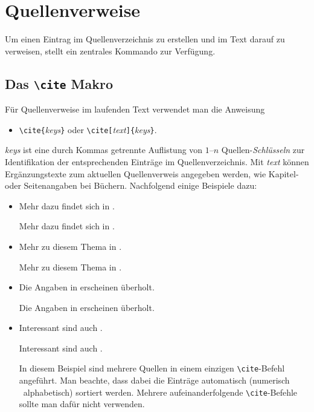 \section{Quellenverweise}

Um einen Eintrag im Quellenverzeichnis zu erstellen und im Text darauf zu verweisen, stellt \latex ein zentrales Kommando zur Verfügung.

\subsection{Das \texttt{\textbackslash cite} Makro}

Für Quellenverweise im laufenden Text verwendet man die Anweisung
\begin{itemize}
\item[] \verb!\cite{!\textit{keys}\verb!}! 
				\quad oder \quad
        \verb!\cite[!\textit{text}\verb!]{!\textit{keys}\verb!}!.
\end{itemize}

\noindent%
\textit{keys} ist eine durch Kommas getrennte Auflistung von $1$--$n$ Quellen-\emph{Schlüsseln}
zur Identifikation der entsprechenden Einträge im Quellenverzeichnis.
Mit \textit{text} können Ergänzungstexte zum aktuellen Quellenverweis angegeben
werden, wie \zB Kapitel- oder Seitenangaben bei Büchern.
Nachfolgend einige Beispiele dazu:
%
\begin{itemize}
\item
Mehr dazu findet sich in \cite{Kopka2003}. %
\begin{LaTeXCode}[numbers=none]
Mehr dazu findet sich in \cite{Kopka2003}.
\end{LaTeXCode}

\item
Mehr zu diesem Thema in \cite[Kap.~3]{Kopka2003}.
\begin{LaTeXCode}[numbers=none]
Mehr zu diesem Thema in \cite[Kap.~3]{Kopka2003}.
\end{LaTeXCode}

\item
Die Angaben in \cite[S.\ 274--277]{BurgeBurger1999} erscheinen überholt.
\begin{LaTeXCode}[numbers=none]
Die Angaben in \cite[S.\ 274--277]{BurgeBurger1999} erscheinen überholt.
\end{LaTeXCode}

\item
Interessant sind auch \cite{BurgeBurger1999,Patashnik1988,Duden1997}.
\begin{LaTeXCode}[numbers=none]
Interessant sind auch \cite{BurgeBurger1999,Patashnik1988,Duden1997}.
\end{LaTeXCode}
In diesem Beispiel sind mehrere Quellen in einem einzigen 
\texttt{\textbackslash cite}-Befehl angeführt. 
Man beachte, dass dabei die Einträge automatisch (numerisch \bzw\ 
alphabetisch) sortiert werden.
Mehrere aufeinanderfolgende \texttt{\textbackslash cite}-Befehle sollte man 
dafür nicht verwenden.
\end{itemize}

